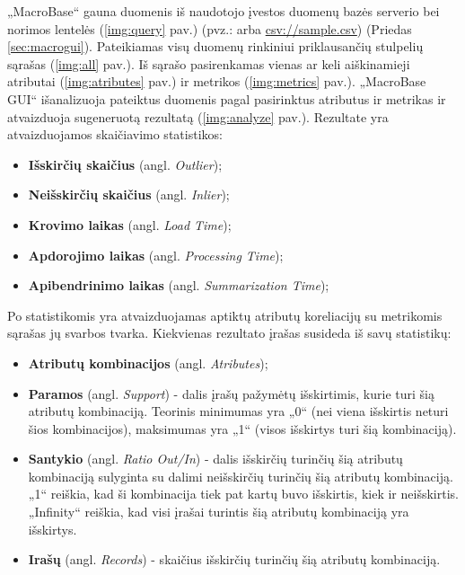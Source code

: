 \documentclass{VUMIFPSkursinis}
\begin{document}
„MacroBase“ gauna duomenis iš naudotojo įvestos duomenų bazės serverio bei norimos lentelės (\ref{img:query} pav.) (pvz.:  arba \url{csv://sample.csv}) (Priedas \ref{sec:macrogui}). Pateikiamas visų duomenų rinkiniui priklausančių stulpelių sąrašas (\ref{img:all} pav.). Iš sąrašo pasirenkamas vienas ar keli aiškinamieji atributai (\ref{img:atributes} pav.) ir metrikos (\ref{img:metrics} pav.). „MacroBase GUI“ išanalizuoja pateiktus duomenis pagal pasirinktus atributus ir metrikas ir atvaizduoja sugeneruotą rezultatą (\ref{img:analyze} pav.). Rezultate yra atvaizduojamos skaičiavimo statistikos:
\begin{itemize}
\item \textbf{Išskirčių skaičius} (angl. \textit{Outlier});
\item \textbf{Neišskirčių skaičius} (angl. \textit{Inlier});
\item \textbf{Krovimo laikas} (angl. \textit{Load Time});
\item \textbf{Apdorojimo laikas} (angl. \textit{Processing Time});
\item \textbf{Apibendrinimo laikas} (angl. \textit{Summarization Time});
\end{itemize}

Po statistikomis yra atvaizduojamas aptiktų atributų koreliacijų su metrikomis sąrašas jų svarbos tvarka. Kiekvienas rezultato įrašas susideda iš savų statistikų:
\begin{itemize}
\item \textbf{Atributų kombinacijos} (angl. \textit{Atributes});

\item \textbf{Paramos} (angl. \textit{Support}) - dalis įrašų pažymėtų išskirtimis, kurie turi šią atributų kombinaciją. Teorinis minimumas yra „0“ (nei viena išskirtis neturi šios kombinacijos), maksimumas yra „1“ (visos išskirtys turi šią kombinaciją).

\item \textbf{Santykio} (angl. \textit{Ratio Out/In}) - dalis išskirčių turinčių šią atributų kombinaciją sulyginta su dalimi neišskirčių turinčių šią atributų kombinaciją. „1“ reiškia, kad ši kombinacija tiek pat kartų buvo išskirtis, kiek ir neišskirtis. „Infinity“ reiškia, kad visi įrašai turintis šią atributų kombinaciją yra išskirtys.

\item \textbf{Irašų} (angl. \textit{Records}) - skaičius išskirčių turinčių šią atributų kombinaciją.
\end{itemize}
\end{document}
